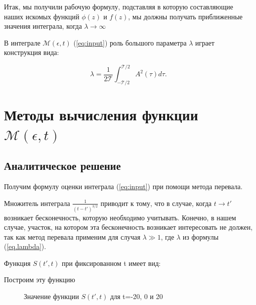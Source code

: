 \documentclass[14pt]{article}
\numberwithin{figure}{section}
\numberwithin{equation}{section}
\newcommand{\sectionbreak}{\clearpage}
\newcommand{\cM}{\mathcal{M}}
\newcommand{\cT}{\mathcal{T}}
\begin{document}
Итак, мы получили рабочую формулу, подставляя в которую составляющие наших искомых функций $\phi (z)$ и $f (z)$, мы должны получать приближенные значения интеграла, когда $\lambda \rightarrow \infty$ 

В интеграле $\cM(\epsilon,t)$ (\ref{eq:input}) роль большого параметра $\lambda$ играет конструкция вида:

\begin{equation}\label{eq.lambda}
\lambda = \frac{1}{2 \cT} \int_{-\cT/2}^{\cT/2} A^2(\tau) d\tau.
\end{equation}

\sectionbreak
\section{Методы вычисления функции $\cM(\epsilon,t)$}
\subsection{Аналитическое решение}
Получим формулу оценки интеграла (\ref{eq:input}) при помощи метода перевала.

Множитель интеграла $\frac{1}{(t-t')^{3/2}}$ приводит к тому, что в случае, когда $t \rightarrow t'$ возникает бесконечность, которую  необходимо учитывать. Конечно, в нашем случае, участок, на котором эта бесконечность возникает интересовать не должен, так как метод перевала применим для случая $\lambda \gg 1$, где $\lambda$ из формулы (\ref{eq.lambda}).  

Функция $S(t', t)$ при фиксированном t имеет вид:

Построим эту функцию 

\begin{figure}[h]
	\caption{Значение функции $S(t', t)$ для t=-20, 0 и 20}
	\label{ris:S}
\end{figure}
\end{document}
